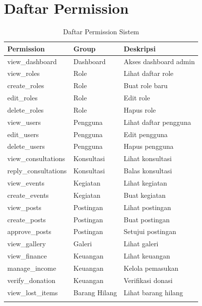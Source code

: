 \documentclass[12pt,a4paper]{article}
\begin{document}
\section{Daftar Permission}
\begin{longtable}{|l|l|p{5cm}|}
\hline
\textbf{Permission} & \textbf{Group} & \textbf{Deskripsi} \\
\hline
view\_dashboard & Dashboard & Akses dashboard admin \\
view\_roles & Role & Lihat daftar role \\
create\_roles & Role & Buat role baru \\
edit\_roles & Role & Edit role \\
delete\_roles & Role & Hapus role \\
view\_users & Pengguna & Lihat daftar pengguna \\
edit\_users & Pengguna & Edit pengguna \\
delete\_users & Pengguna & Hapus pengguna \\
view\_consultations & Konsultasi & Lihat konsultasi \\
reply\_consultations & Konsultasi & Balas konsultasi \\
view\_events & Kegiatan & Lihat kegiatan \\
create\_events & Kegiatan & Buat kegiatan \\
view\_posts & Postingan & Lihat postingan \\
create\_posts & Postingan & Buat postingan \\
approve\_posts & Postingan & Setujui postingan \\
view\_gallery & Galeri & Lihat galeri \\
view\_finance & Keuangan & Lihat keuangan \\
manage\_income & Keuangan & Kelola pemasukan \\
verify\_donation & Keuangan & Verifikasi donasi \\
view\_lost\_items & Barang Hilang & Lihat barang hilang \\
\hline
\caption{Daftar Permission Sistem}
\end{longtable}
\end{document}
